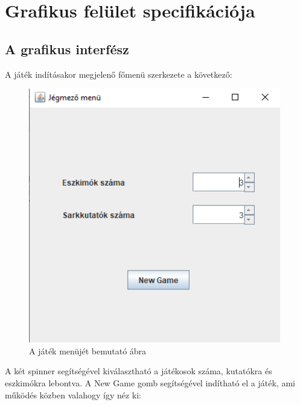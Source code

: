 %
\chapter{Grafikus felület specifikációja}

\thispagestyle{fancy}

\section{A grafikus interfész}

A játék indításakor megjelenő főmenü szerkezete a következő:

\begin{figure}[H]
	\begin{center}
		\includegraphics[width=11cm]{chapters/chapter11/res/menu.png}
		\caption{A játék menüjét bemutató ábra}
		\label{fig:Menu}
	\end{center}
\end{figure}

A két spinner segítségével kiválasztható a játékosok száma, kutatókra és eszkimókra lebontva.
A New Game gomb segítségével indítható el a játék, ami működés közben valahogy így néz ki:

